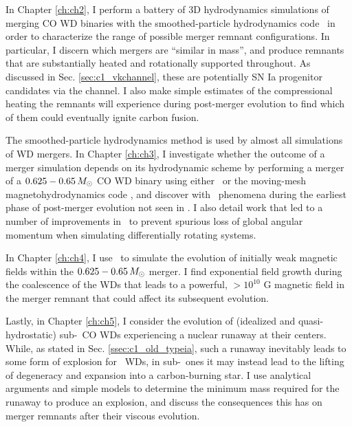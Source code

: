 
In Chapter \ref{ch:ch2}, I perform a battery of 3D hydrodynamics simulations of merging CO WD binaries with the smoothed-particle hydrodynamics code \gasoline\ in order to characterize the range of possible merger remnant configurations.  In particular, I discern which mergers are ``similar in mass'', and produce remnants that are substantially heated and rotationally supported throughout.  As discussed in Sec. \ref{sec:c1_vkchannel}, these are potentially SN Ia progenitor candidates via the \citeal{vkercj10} channel.  I also make simple estimates of the compressional heating the remnants will experience during post-merger evolution to find which of them could eventually ignite carbon fusion.

The smoothed-particle hydrodynamics method is used by almost all simulations of WD mergers.  In Chapter \ref{ch:ch3}, I investigate whether the outcome of a merger simulation depends on its hydrodynamic scheme by performing a merger of a $0.625 - 0.65\,\Msun$ CO WD binary using either \gasoline\ or the moving-mesh magnetohydrodynamics code \arepo, and discover with \arepo\ phenomena during the earliest phase of post-merger evolution not seen in \gasoline.  I also detail work that led to a number of improvements in \arepo\ to prevent spurious loss of global angular momentum when simulating differentially rotating systems.

In Chapter \ref{ch:ch4}, I use \arepo\ to simulate the evolution of initially weak magnetic fields within the $0.625 - 0.65\,\Msun$ merger.  I find exponential field growth during the coalescence of the WDs that leads to a powerful, $>10^{10}$ G magnetic field in the merger remnant that could affect its subsequent evolution.

Lastly, in Chapter \ref{ch:ch5}, I consider the evolution of (idealized and quasi-hydrostatic) sub-\Mch\ CO WDs experiencing a nuclear runaway at their centers.  While, as stated in Sec. \ref{ssec:c1_old_typeia}, such a runaway inevitably leads to some form of explosion for \Mch\ WDs, in sub-\Mch\ ones it may instead lead to the lifting of degeneracy and expansion into a carbon-burning star.  I use analytical arguments and simple models to determine the minimum mass required for the runaway to produce an explosion, and discuss the consequences this has on merger remnants after their viscous evolution.

